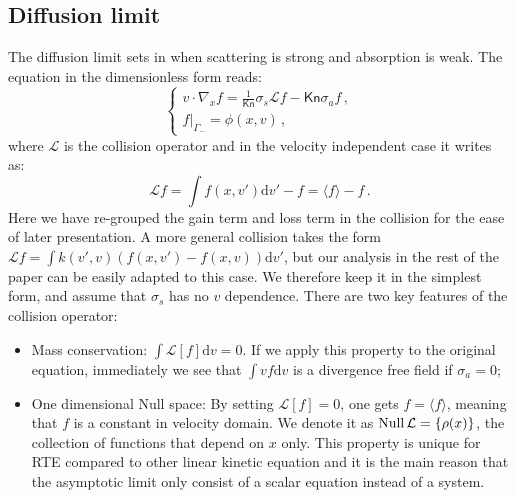\documentclass[english,reqno]{amsart}
\theoremstyle{plain}
\theoremstyle{definition} %
\newcommand{\NullL}{{\rm Null} \,\opL}
\newcommand{\opL}{\mathcal{L}}
\newcommand{\rd}{\mathrm{d}}
\newcommand{\Kn}{\mathsf{Kn}}
\begin{document}
\subsection{Diffusion limit}
The diffusion limit sets in when scattering is strong and absorption is weak. The equation in the dimensionless form reads:
\begin{equation}\label{eqn:RTE}
\begin{cases}
v\cdot\nabla_xf = \frac{1}{\Kn}\sigma_s\mathcal{L}f - \Kn\sigma_af\,,\\
f|_{\Gamma_-} = \phi(x,v)\,,
\end{cases}
\end{equation}
where $\mathcal{L}$ is the collision operator and in the velocity independent case it writes as:
\begin{equation}\label{eqn:collision}
\mathcal{L} f = \int f(x,v')\rd{v'} - f = \langle f\rangle - f\,.
\end{equation}
Here we have re-grouped the gain term and loss term in the collision for the ease of later presentation. A more general collision takes the form $\mathcal{L} f = \int k(v',v)(f(x,v')-f(x,v)) \rd{v}'$, but our analysis in the rest of the paper can be easily adapted to this case. We therefore keep it in the simplest form, and assume that $\sigma_s$ has no $v$ dependence. There are two key features of the collision operator:
\begin{itemize}
\item{Mass conservation}: $\int \mathcal{L}[f]\rd{v} = 0$. If we apply this property to the original equation, immediately we see that $\int vf\rd{v}$ is a divergence free field if $\sigma_a = 0$;
\item{One dimensional Null space}: By setting $\mathcal{L}[f]=0$, one gets $f = \langle f\rangle$, meaning that $f$ is a constant in velocity domain. We denote it as $\NullL = \{\rho(x)\}$, the collection of functions that depend on $x$ only. This property is unique for RTE compared to other linear kinetic equation and it is the main reason that the asymptotic limit only consist of a scalar equation instead of a system.  
\end{itemize}
\end{document}
